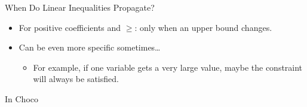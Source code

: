 \documentclass[aspectratio=169,compress,10pt]{beamer}
\begin{document}
\begin{frame}{When Do Linear Inequalities Propagate?}
    \begin{itemize}
        \item For positive coefficients and $\ge$: only when an upper bound changes.
        \item Can be even more specific sometimes\ldots
            \begin{itemize}
                \item For example, if one variable gets a very large value, maybe
                    the constraint will always be satisfied.
            \end{itemize}
    \end{itemize}
\end{frame}

\begin{frame}[fragile]{In Choco}
     {
        
    }
     {
        \begin{minipage}{0.47\paperwidth}
        \end{minipage}\begin{minipage}{0.44\paperwidth}
        \end{minipage}
    }
\end{frame}
\end{document}
